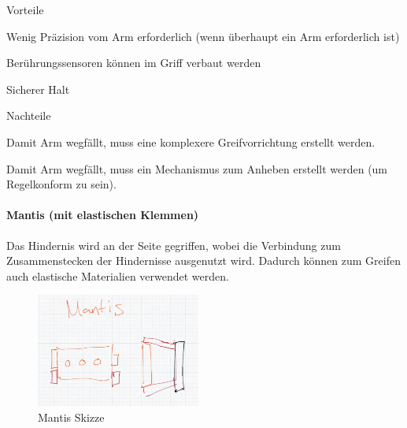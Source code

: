 \documentclass[../main.tex]{subfiles}
\begin{document}
\begin{minipage}[t]{0.48\textwidth}
    \begin{items}
          \item [Vorteile]
          \item Wenig Präzision vom Arm erforderlich (wenn überhaupt ein Arm erforderlich ist)
          \item Berührungssensoren können im Griff verbaut werden
          \item Sicherer Halt
    \end{items}
\end{minipage}
\hfill
\begin{minipage}[t]{0.48\textwidth}
    \begin{items}
          \item [Nachteile]
          \item Damit Arm wegfällt, muss eine komplexere Greifvorrichtung erstellt werden.
          \item Damit Arm wegfällt, muss ein Mechanismus zum Anheben erstellt werden (um Regelkonform zu sein).
    \end{items}
\end{minipage}
\newpage
\paragraph{Mantis (mit elastischen Klemmen)}
Das Hindernis wird an der Seite gegriffen, wobei die Verbindung zum Zusammenstecken der Hindernisse ausgenutzt wird. Dadurch können zum Greifen auch elastische Materialien verwendet werden.

\begin{figure}[h!]
        \centering
        \includegraphics[width=0.48\textwidth]{img/technologierecherche/Aufnahme/Mantis.jpg}
        \caption{Mantis Skizze}
        \label{img:tech_Mantis}
\end{figure}
\end{document}
